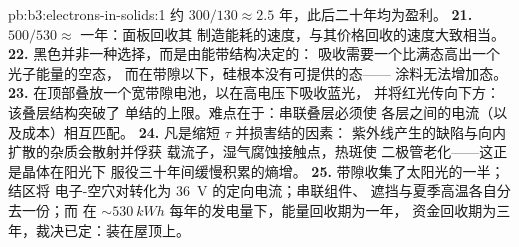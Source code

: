 \begin{solution}{pb:b3:electrons-in-solids:1}
约 $300/130 \approx 2.5$ 年，此后二十年均为盈利。
\textbf{21.} $500/530 \approx$ 一年：面板回收其
制造能耗的速度，与其价格回收的速度大致相当。
\textbf{22.} 黑色并非一种选择，而是由能带结构决定的：
吸收需要一个比满态高出一个光子能量的空态，
而在带隙以下，硅根本没有可提供的态——
涂料无法增加态。
\textbf{23.} 在顶部叠放一个宽带隙电池，以在高电压下吸收蓝光，
并将红光传向下方：该叠层结构突破了
单结的上限。难点在于：串联叠层必须使
各层之间的电流（以及成本）相互匹配。
\textbf{24.} 凡是缩短 $\tau$ 并损害结的因素：
紫外线产生的缺陷与向内扩散的杂质会散射并俘获
载流子，湿气腐蚀接触点，热斑使
二极管老化——这正是晶体在阳光下
服役三十年间缓慢积累的熵增。
\textbf{25.} 带隙收集了太阳光的一半；结区将
电子-空穴对转化为 \qty{36}{V} 的定向电流；串联组件、
遮挡与夏季高温各自分去一份；而
在 $\sim\qty{530}{kWh}$ 每年的发电量下，能量回收期为一年，
资金回收期为三年，裁决已定：装在屋顶上。
\end{solution}
